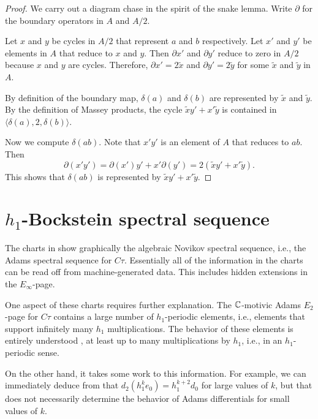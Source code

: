 \begin{proof}
We carry out a diagram chase in the spirit of the snake lemma.
Write $\partial$ for the boundary operators in $A$ and $A/2$.

Let $x$ and $y$ be cycles in $A/2$ that represent $a$ and $b$
respectively.
Let $x'$ and $y'$ be elements in $A$ that reduce to $x$ and $y$.
Then $\partial x'$ and $\partial y'$ reduce to zero in $A/2$
because $x$ and $y$ are cycles.
Therefore, $\partial x' = 2 \widetilde{x}$ and
$\partial y' = 2 \widetilde{y}$ 
for some $\widetilde{x}$ and $\widetilde{y}$ in $A$.

By definition of the boundary map,
$\delta(a)$ and $\delta(b)$ are represented by $\widetilde{x}$
and $\widetilde{y}$.  By the definition of Massey products,
the cycle
$\widetilde{x} y' + x' \widetilde{y}$ is contained in 
$\langle \delta(a), 2, \delta(b) \rangle$.

Now we compute $\delta(a b)$.
Note that $x' y'$ is an element of $A$ that reduces to $a b$.
Then 
\[
\partial (x' y') = \partial(x') y' + x' \partial(y') =
2 (\widetilde{x} y' + x' \widetilde{y}).
\]
This shows that $\delta(a b)$ is represented by
$\widetilde{x} y' + x' \widetilde{y}$.
\end{proof}


\section{$h_1$-Bockstein spectral sequence}
\label{sctn:h1-Bockstein}

The charts in \cite{IWX19} show graphically 
the algebraic Novikov spectral sequence,
i.e., the Adams spectral sequence for $C\tau$.  Essentially all of
the information in the charts can be read off from machine-generated data.
This includes hidden extensions in the $E_\infty$-page.

One aspect of these charts requires further explanation.
The $\mathbb{C}$-motivic Adams $E_2$-page for $C\tau$ contains a large
number of $h_1$-periodic elements, i.e.,
elements that support infinitely many $h_1$ multiplications.
The behavior of these elements is entirely understood
\cite{GI15}, at least up to many multiplications by $h_1$,
i.e., in an $h_1$-periodic sense.

On the other hand, it takes some work to 
this information.  For example, we can immediately deduce from
\cite{GI15} that $d_2(h_1^k e_0) = h_1^{k+2} d_0$ for large
values of $k$, but that does not necessarily determine
the behavior of Adams differentials for small values of $k$.

